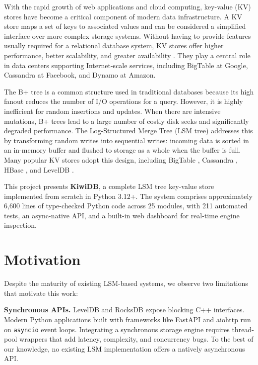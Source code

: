 \documentclass[oneside,a4paper,12pt]{book}
\begin{document}
With the rapid growth of web applications and cloud computing, key-value (KV) stores have become a critical component of modern data infrastructure. A KV store maps a set of keys to associated values and can be considered a simplified interface over more complex storage systems. Without having to provide features usually required for a relational database system, KV stores offer higher performance, better scalability, and greater availability \cite{c1}. They play a central role in data centers supporting Internet-scale services, including BigTable \cite{c2} at Google, Cassandra \cite{c3} at Facebook, and Dynamo \cite{c4} at Amazon.

The B+ tree is a common structure used in traditional databases because its high fanout reduces the number of I/O operations for a query. However, it is highly inefficient for random insertions and updates. When there are intensive mutations, B+ trees lead to a large number of costly disk seeks and significantly degraded performance. The Log-Structured Merge Tree (LSM tree) \cite{c5} addresses this by transforming random writes into sequential writes: incoming data is sorted in an in-memory buffer and flushed to storage as a whole when the buffer is full. Many popular KV stores adopt this design, including BigTable \cite{c2}, Cassandra \cite{c3}, HBase \cite{c6}, and LevelDB \cite{c7}.

This project presents \textbf{KiwiDB}, a complete LSM tree key-value store implemented from scratch in Python 3.12+. The system comprises approximately 6,600 lines of type-checked Python code across 25 modules, with 211 automated tests, an async-native API, and a built-in web dashboard for real-time engine inspection.

\section{Motivation}

Despite the maturity of existing LSM-based systems, we observe two limitations that motivate this work:

\textbf{Synchronous APIs.} LevelDB and RocksDB \cite{c8} expose blocking C++ interfaces. Modern Python applications built with frameworks like FastAPI and aiohttp run on \texttt{asyncio} event loops. Integrating a synchronous storage engine requires thread-pool wrappers that add latency, complexity, and concurrency bugs. To the best of our knowledge, no existing LSM implementation offers a natively asynchronous API.
\end{document}
